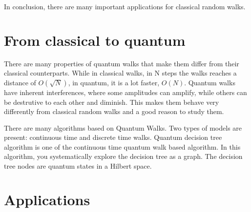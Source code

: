 In conclusion, there are many important applications for classical random walks.

\section{From classical to quantum}

There are many properties of quantum walks that make them differ from their classical counterparts. While in classical walks, in N steps the walks reaches a distance of $O(\sqrt{N})$, in quantum, it is a lot faster, $O(N)$. Quantum walks have inherent interferences, where some amplitudes can amplify, while others can be destrutive to each other and diminish. This makes them behave very differently from classical random walks and a good reason to study them.

There are many algorithms based on Quantum Walks. Two types of models are present: continuous time and discrete time walks. Quantum decision tree algorithm is one of the continuous time quantum walk based algorithm. In this algorithm, you systematically explore the decision tree as a graph. The decision tree nodes are quantum states in a Hilbert space. 

\section{Applications}

